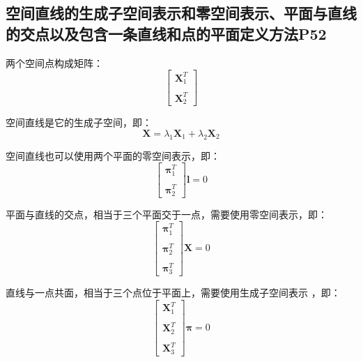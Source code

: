 \documentclass[11pt]{article}
\begin{document}
\subsection{	空间直线的生成子空间表示和零空间表示、平面与直线的交点以及包含一条直线和点的平面定义方法P52}
两个空间点构成矩阵：
\begin{equation*}
  \begin{bmatrix}
    \mathbold{X}_1^T \\\\
    \mathbold{X}_2^T
  \end{bmatrix}
\end{equation*}\par
空间直线是它的生成子空间，即：
\begin{equation*}
  \mathbold{X}=\lambda_1\mathbold{X}_1+\lambda_2\mathbold{X}_2
\end{equation*}\par
空间直线也可以使用两个平面的零空间表示，即：
\begin{equation*}
  \begin{bmatrix}
    \mathbold{\pi}_1^T \\\\
    \mathbold{\pi}_2^T
  \end{bmatrix} \mathbold{l}=0
\end{equation*}\par
平面与直线的交点，相当于三个平面交于一点，需要使用零空间表示，即：
\begin{equation*}
  \begin{bmatrix}
    \mathbold{\pi}_1^T \\\\
    \mathbold{\pi}_2^T \\\\
    \mathbold{\pi}_3^T
  \end{bmatrix} \mathbold{X}=0
\end{equation*}\par
直线与一点共面，相当于三个点位于平面上，需要使用生成子空间表示 ，即：
\begin{equation*}
  \begin{bmatrix}
    \mathbold{X}_1^T \\\\
    \mathbold{X}_2^T \\\\
    \mathbold{X}_3^T
  \end{bmatrix} \mathbold{\pi}=0
\end{equation*}\par
\end{document}
